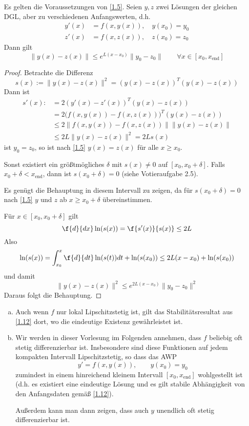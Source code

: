 \documentclass[
]{mycourse}
\begin{document}
\begin{st} \label{1.12}
	Es gelten die Voraussetzungen von \ref{1.5}.
	Seien $y,z$ zwei Lösungen der gleichen DGL, aber zu verschiedenen Anfangswerten, d.h.
	\begin{align*}
		y'(x) &= f(x,y(x)), \quad y(x_0) = y_0 \\
		z'(x) &= f(x,z(x)), \quad z(x_0) = z_0
	\end{align*}
	Dann gilt
	\[
		\|y(x) - z(x)\| \le e^{L(x-x_0)} \|y_0 - z_0\|
		\qquad \forall x \in [x_0,x_{\text{end}}]
	\]
	\begin{proof}
		Betrachte die Differenz
		\[
			s(x) := \|y(x) - z(x)\|^2 = (y(x)-z(x))^T (y(x) - z(x))
		\]
		Dann ist
		\begin{align*}
			s'(x) :&= 2(y'(x)-z'(x))^T (y(x)-z(x)) \\
			&= 2 \Big( f(x,y(x)) - f(x,z(x)) \Big)^T (y(x) -z(x)) \\ 
			&\le 2 \Big\| f(x,y(x)) - f(x, z(x)) \Big\| \| y(x) -z(x)\| \\
			&\le 2 L \|y(x) - z(x) \|^2 
			= 2 Ls(x)
		\end{align*}
		ist $y_0 = z_0$, so ist nach \ref{1.5} $y(x) = z(x)$ für alle $x \ge x_0$.

		Sonst existiert ein größtmögliches $\delta$ mit $s(x) \neq 0$ auf $[x_0,x_0 + \delta]$.
		Falls $x_0 + \delta < x_{\text{end}}$, dann ist $s(x_0 + \delta) = 0$ (siehe Votieraufgabe 2.5).

		Es genügt die Behauptung in diesem Intervall zu zeigen, da für $s(x_0 + \delta) = 0$ nach \ref{1.5} $y$ und $z$ ab $x \ge x_0 + \delta$ übereinstimmen.

		Für $x \in [x_0, x_0 + \delta]$ gilt
		\[
			\f{d}{dx} \ln (s(x)) = \f {s'(x)}{s(x)} \le 2L
		\]
		Also
		\[
			\ln (s(x))  
			= \int_{x_0}^x \f {d}{dt} \ln(s(t)) dt + \ln(s(x_0))
			\le 2 L (x-x_0) + \ln (s(x_0))
		\]
		und damit
		\[
			\|y(x) - z(x)\|^2 \le e^{2L(x-x_0)} \|y_0-z_0\|^2
		\]
		Daraus folgt die Behauptung.
	\end{proof}
\end{st}


\begin{nt} \label{1.13}
	\begin{enumerate}[a)]
		\item
			Auch wenn $f$ nur lokal Lipschitzstetig ist, gilt das Stabilitätsresultat aus \ref{1.12} dort, wo die eindeutige Existenz gewährleistet ist.
		\item
			Wir werden in dieser Vorlesung im Folgenden annehmen, dass $f$ beliebig oft stetig differenzierbar ist.
			Insbesondere sind diese Funktionen auf jedem kompakten Intervall Lipschitzstetig, so dass das AWP 
			\[
				y'=f(x,y(x)), \qquad y(x_0) = y_0
			\]
			zumindest in einem hinreichend kleinem Intervall $[x_0, x_{\text{end}}]$ wohlgestellt ist (d.h. es existiert eine eindeutige Lösung und es gilt stabile Abhängigkeit von den Anfangsdaten gemäß \ref{1.12}).

			Außerdem kann man dann zeigen, dass auch $y$ unendlich oft stetig differenzierbar ist.
	\end{enumerate}
\end{nt}
\end{document}
